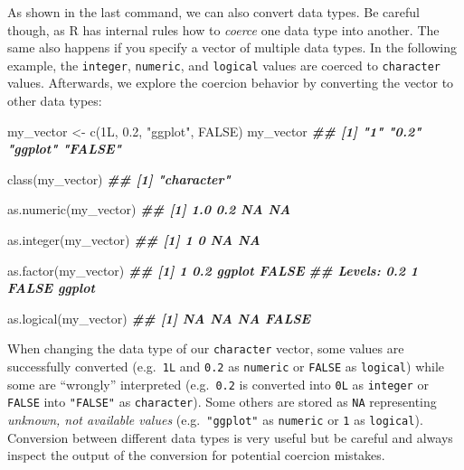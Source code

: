 \documentclass[
]{krantz}
\makeatletter
\newenvironment{Shaded}{\begin{snugshade}}{\end{snugshade}}
\newcommand{\ConstantTok}[1]{\textcolor[rgb]{0,0,0}{#1}}
\newcommand{\DocumentationTok}[1]{\textcolor[rgb]{0.37,0.37,0.37}{\textbf{\textit{#1}}}}
\newcommand{\FloatTok}[1]{\textcolor[rgb]{0.06,0.06,0.06}{#1}}
\newcommand{\FunctionTok}[1]{\textcolor[rgb]{0,0,0}{#1}}
\newcommand{\NormalTok}[1]{#1}
\newcommand{\OtherTok}[1]{\textcolor[rgb]{0.37,0.37,0.37}{#1}}
\newcommand{\SpecialCharTok}[1]{\textcolor[rgb]{0,0,0}{#1}}
\newcommand{\StringTok}[1]{\textcolor[rgb]{0.5,0.5,0.5}{#1}}
\newenvironment{kframe}{%
\medskip{}
\setlength{\fboxsep}{.8em}
 \def\at@end@of@kframe{}%
 \ifinner\ifhmode%
  \def\at@end@of@kframe{\end{minipage}}%
  \begin{minipage}{\columnwidth}%
 \fi\fi%
 \def\FrameCommand##1{\hskip\@totalleftmargin \hskip-\fboxsep
 \colorbox{shadecolor}{##1}\hskip-\fboxsep
     \hskip-\linewidth \hskip-\@totalleftmargin \hskip\columnwidth}%
 \MakeFramed {\advance\hsize-\width
   \@totalleftmargin\z@ \linewidth\hsize
   \@setminipage}}%
 {\par\unskip\endMakeFramed%
 \at@end@of@kframe}
\renewenvironment{Shaded}{\begin{kframe}}{\end{kframe}}
\makeatother
\begin{document}
\begin{Shaded}
\end{Shaded}

As shown in the last command, we can also convert data types. Be careful though, as R has internal rules how to \emph{coerce} one data type into another. The same also happens if you specify a vector of multiple data types. In the following example, the \texttt{integer}, \texttt{numeric}, and \texttt{logical} values are coerced to \texttt{character} values. Afterwards, we explore the coercion behavior by converting the vector to other data types:

\begin{Shaded}
\begin{Highlighting}[]
\NormalTok{my\_vector }\OtherTok{\textless{}{-}} \FunctionTok{c}\NormalTok{(1L, }\FloatTok{0.2}\NormalTok{, }\StringTok{"ggplot"}\NormalTok{, }\ConstantTok{FALSE}\NormalTok{)}
\NormalTok{my\_vector}
\DocumentationTok{\#\# [1] "1"      "0.2"    "ggplot" "FALSE"}

\FunctionTok{class}\NormalTok{(my\_vector)}
\DocumentationTok{\#\# [1] "character"}

\FunctionTok{as.numeric}\NormalTok{(my\_vector)}
\DocumentationTok{\#\# [1] 1.0 0.2  NA  NA}

\FunctionTok{as.integer}\NormalTok{(my\_vector)}
\DocumentationTok{\#\# [1]  1  0 NA NA}

\FunctionTok{as.factor}\NormalTok{(my\_vector)}
\DocumentationTok{\#\# [1] 1      0.2    ggplot FALSE }
\DocumentationTok{\#\# Levels: 0.2 1 FALSE ggplot}

\FunctionTok{as.logical}\NormalTok{(my\_vector)}
\DocumentationTok{\#\# [1]    NA    NA    NA FALSE}
\end{Highlighting}
\end{Shaded}

When changing the data type of our \texttt{character} vector, some values are successfully converted (e.g.~\texttt{1L} and \texttt{0.2} as \texttt{numeric} or \texttt{FALSE} as \texttt{logical}) while some are ``wrongly'' interpreted (e.g.~\texttt{0.2} is converted into \texttt{0L} as \texttt{integer} or \texttt{FALSE} into \texttt{"FALSE"} as \texttt{character}). Some others are stored as \texttt{NA} representing \emph{unknown, not available values} (e.g.~\texttt{"ggplot"} as \texttt{numeric} or \texttt{1} as \texttt{logical}). Conversion between different data types is very useful but be careful and always inspect the output of the conversion for potential coercion mistakes.
\end{document}
